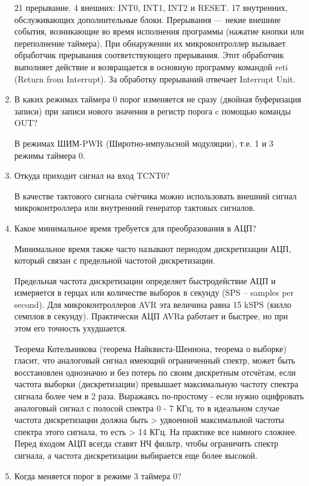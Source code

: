 \documentclass{lab}
\begin{document}
\begin{enumerate}
	21 прерывание. 4 внешних: INT0, INT1, INT2 и RESET. 17 внутренних, обслуживающих
	дополнительные блоки. Прерывания — некие внешние события, возникающие во время
	исполнения программы (нажатие кнопки или переполнение таймера). При обнаружении
	их микроконтроллер вызывает обработчик прерывания соответствующего прерывания.
	Этот обработчик выполняет действие и возвращается в основную программу командой
	reti (Return from Interrupt). За обработку прерываний отвечает Interrupt Unit.
	\item В каких режимах таймера 0 порог изменяется не сразу (двойная буферизация записи) при записи нового значения в регистр порога c помощью команды OUT?
	
	В режимах ШИМ-PWR (Широтно-импульсной модуляции), т.е. 1 и 3 режимы таймера 0. 
	
	
	\item Откуда приходит сигнал на вход TCNT0?
	
	В качестве тактового сигнала счётчика можно использовать внешний сигнал микроконтроллера или внутренний генератор тактовых сигналов.
	
	
	\item Какое минимальное время требуется для преобразования в АЦП?
	
	Минимальное время также часто называют периодом дискретизации АЦП, который связан с предельной частотой дискретизации.
	
	Предельная частота дискретизации определяет быстродействие АЦП и измеряется в герцах или количестве выборок в секунду (SPS – samples per second). Для микроконтроллеров AVR эта величина равна 15 kSPS (килло семплов в секунду). Практически АЦП AVRа работает и быстрее, но при этом  его точность ухудшается.
	
	Теорема Котельникова (теорема Найквиста-Шеннона, теорема о выборке) гласит, что аналоговый сигнал имеющий ограниченный спектр, может быть восстановлен однозначно и без потерь по своим дискретным отсчётам, если частота выборки (дискретизации) превышает максимальную частоту спектра  сигнала более чем в 2 раза. Выражаясь по-простому - если нужно оцифровать аналоговый сигнал с полосой спектра 0 - 7 КГц, то в идеальном случае частота дискретизации должна быть > удвоенной максимальной частоты спектра этого сигнала, то есть > 14 КГц. На практике все намного сложнее. Перед входом АЦП всегда ставят НЧ фильтр, чтобы ограничить спектр сигнала, а частота дискретизации выбирается еще более высокой. 
	
	\item Когда меняется порог в режиме 3 таймера 0?
	

\end{enumerate}
\end{document}
